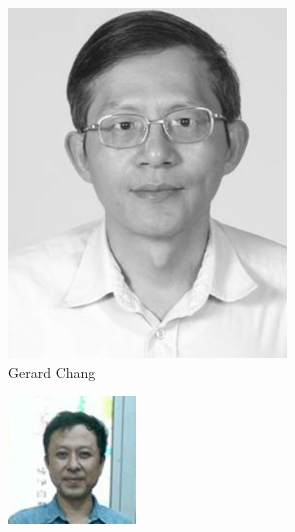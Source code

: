 \begin{frame}
	\begin{figure}
		\begin{subfigure}[h]{0.4\linewidth}
			\includegraphics[width=\linewidth]{G-Chang.jpg}
			\caption{Gerard Chang}
		\end{subfigure}
		\hfill
		\begin{subfigure}[h]{0.4\linewidth}
			\includegraphics[width=\linewidth]{David-Kuo.jpg}

\end{subfigure}
\end{figure}
\end{frame}
